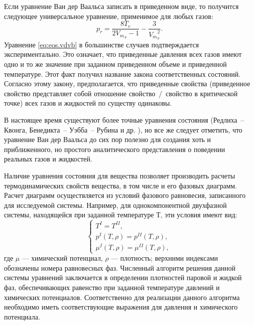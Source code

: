 Если уравнение Ван дер Ваальса записать в приведенном виде, то получится следующее универсальное уравнение, применимое для любых газов:
\begin{equation} \label{eq:eos.vdvb}
	p_r=\dfrac{8 T_r}{2 {V_m}_r-1}-\dfrac{3}{{V_m}_r^2}.
\end{equation}
Уравнение \eqref{eq:eos.vdvb} в большинстве случаев подтверждается экспериментально. Это означает, что приведенные давления всех газов имеют одно и то же значение при заданном приведенном объеме и приведенной температуре. Этот факт получил название закона соответственных состояний. Согласно этому закону, предполагается, что приведенные свойства (приведенное свойство представляет собой отношение свойство / свойство в критической точке) всех газов и жидкостей по существу одинаковы.

В настоящее время существуют более точные уравнения состояния (Редлиха~-- Квонга, Бенедикта~-- Уэбба~-- Рубина и др. \cite{rid1982,yelles1989}), но все же следует отметить, что уравнение Ван дер Ваальса до сих пор полезно для создания хоть и приближенного, но простого аналитического представления о поведении реальных газов и жидкостей.

Наличие уравнения состояния для вещества позволяет производить расчеты термодинамических свойств вещества, в том числе и его фазовых диаграмм. Расчет диаграмм осуществляется из условий фазового равновесия, записанного для исследуемой системы. Например, для однокомпонентной двухфазной системы, находящейся при заданной температуре $Т$, эти условия имеют вид:
\begin{equation}\label{eq:oes.equi}
\left\lbrace 
\begin{gathered} 
T^{I}=T^{II},\\
p^{I}(T,\rho)=p^{II}(T,\rho),\\
\mu^{I}(T,\rho)=\mu^{II}(T,\rho),
\end{gathered} 
\right.
\end{equation}
где $\mu$ --- химический потенциал, $\rho$ --- плотность; верхними индексами обозначены номера равновесных фаз. Численный алгоритм решения данной системы уравнений заключается в определении плотностей паровой и жидкой фаз, обеспечивающих равенство при заданной температуре давлений и химических потенциалов. Соответственно для реализации данного алгоритма необходимо иметь соответствующие выражения для давления и химического потенциала.


